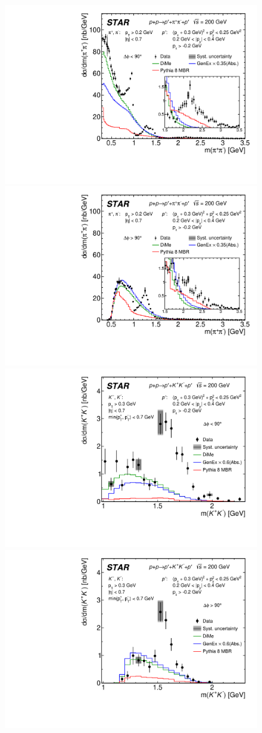 \begin{figure}[t]
\centering
\hspace*{5pt}
\includegraphics[width=.46\textwidth,page=1]{graphics/physicsResults/FinalResult_InvMass_DeltaPhiBin1_pion.pdf}
\hfill
\includegraphics[width=.46\textwidth,page=1]{graphics/physicsResults/FinalResult_InvMass_DeltaPhiBin2_pion.pdf}
\hspace*{5pt}
\newline
\hspace*{5pt}
\includegraphics[width=.46\textwidth,page=1]{graphics/physicsResults/FinalResult_InvMass_DeltaPhiBin1_kaon.pdf}
\hfill
\includegraphics[width=.46\textwidth,page=1]{graphics/physicsResults/FinalResult_InvMass_DeltaPhiBin2_kaon.pdf}
\hspace*{5pt}
\newline

\end{figure}
